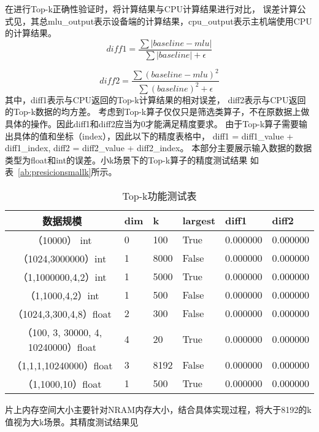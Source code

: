 在进行Top-k正确性验证时，将计算结果与CPU计算结果进行对比，
误差计算公式见，其总mlu\_output表示设备端的计算结果，cpu\_output表示主机端使用CPU的计算结果。
    \begin{equation}
    \label{eq:diff1}
    diff1 = \frac{\sum \vert baseline - mlu \vert}{\sum \vert baseline \vert + \epsilon}
    \end{equation}
    
    \begin{equation}
    \label{eq:diff2}
    diff2 = \frac{\sum (baseline - mlu)^2}{\sum (baseline)^2 + \epsilon}
    \end{equation}
其中，diff1表示与CPU返回的Top-k计算结果的相对误差，
diff2表示与CPU返回的Top-k数据的均方差。
考虑到Top-k算子仅仅只是筛选类算子，不在原数据上做具体的操作。因此diff1和diff2应当为0才能满足精度要求。
由于Top-k算子需要输出具体的值和坐标（index），因此以下的精度表格中，
diff1 = diff1\_value + diff1\_index,
diff2 = diff2\_value + diff2\_index。
本部分主要展示输入数据的数据类型为float和int的误差。小k场景下的Top-k算子的精度测试结果
如表~\ref{ab:presicionsmallk}所示。
\begin{table}
\centering
\caption{Top-k功能测试表}
\label{tab:presicionsmallk}
\begin{tabular}{clllll}
    \toprule
    数据规模      &dim   & k  & largest & diff1    & diff2 \\
    \midrule
    （10000） int &0  & 100      & True      & 0.000000 & 0.000000 \\
    （1024,3000000）int&1 & 8000 & False      & 0.000000 & 0.000000 \\
    （1,1000000,4,2）int &1  & 5000 & True      & 0.000000 & 0.000000 \\
    （1,1000,4,2）int &1  & 500 & False      & 0.000000 & 0.000000 \\
    
    （1024,3,300,4,8）float&2 & 300 & False      & 0.000000 & 0.000000 \\
    （100, 3, 30000, 4, 10240000）float&4 & 20 & True      & 0.000000 & 0.000000 \\
    （1,1,1,10240000）float & 3 & 8192 & False      & 0.000000 & 0.000000 \\
    （1,1000,10）float & 1  & 500 & True      & 0.000000 & 0.000000 \\
    
\bottomrule
\end{tabular}
\end{table}
片上内存空间大小主要针对NRAM内存大小，结合具体实现过程，将大于8192的k值视为大k场景。其精度测试结果见
